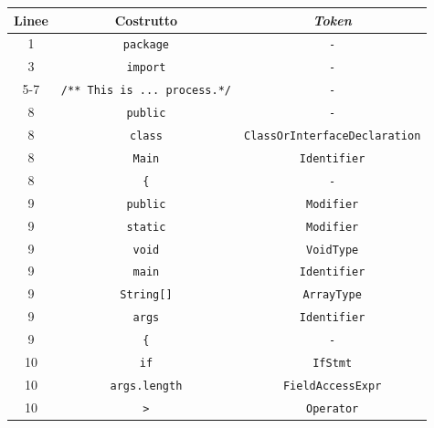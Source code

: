 \begin{table}[h!]
    \centering
    \begin{tabular}{|c|c|c|} 
        \hline
        \textbf{Linee} & \textbf{Costrutto} & \textbf{\textit{Token}} \\ [0.5ex] 
        \hline\hline
        1   & \texttt{package}                    & \texttt{-}                            \\ \hline
        3   & \texttt{import}                     & \texttt{-}                            \\ \hline
        5-7 & \texttt{/** This is ... process.*/} & \texttt{-}                            \\ \hline
        8   & \texttt{public}                     & \texttt{-}                            \\ \hline
        8   & \texttt{class}                      & \texttt{ClassOrInterfaceDeclaration}  \\ \hline
        8   & \texttt{Main}                       & \texttt{Identifier}                   \\ \hline
        8   & \texttt{\{}                         & \texttt{-}                            \\ \hline
        9   & \texttt{public}                     & \texttt{Modifier}                     \\ \hline
        9   & \texttt{static}                     & \texttt{Modifier}                     \\ \hline
        9   & \texttt{void}                       & \texttt{VoidType}                     \\ \hline
        9   & \texttt{main}                       & \texttt{Identifier}                   \\ \hline
        9   & \texttt{String[]}                   & \texttt{ArrayType}                    \\ \hline
        9   & \texttt{args}                       & \texttt{Identifier}                   \\ \hline
        9   & \texttt{\{}                         & \texttt{-}                            \\ \hline
        10  & \texttt{if}                         & \texttt{IfStmt}                       \\ \hline
        10  & \texttt{args.length}                & \texttt{FieldAccessExpr}              \\ \hline
        10  & \texttt{>}                          & \texttt{Operator}                     \\ \hline

\end{tabular}
\end{table}
